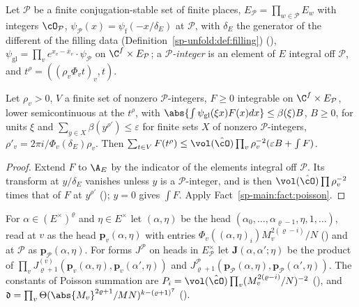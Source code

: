 Let $\mathcal P$ be a finite conjugation-stable set of finite places, $E_{\mathcal P}=\prod_{w\in\mathcal P}E_w$ with
integers $\cO_{\mathcal P}$, $\psi_{\mathcal P}(x)=\psi_{\mathrm f}(-x/\delta_E)$ at $\mathcal P$, with $\delta_E$ the generator of
the different of the filling data (Definition~\ref{sp-unfold:def:filling})
(), $\psi_{\mathrm{gl}}=\prod_ve^{x_v-\bar x_v}\cdot\psi_{\mathcal P}$ on
$\C^f\times E_{\mathcal P}$; a \emph{$\mathcal P$-integer} is an element of $E$ integral off $\mathcal P$, and
$t^\rho=((\rho_v\Phi_vt)_v,t)$.

\begin{proposition}
\label{sp-main:prop:poisson}
Let $\rho_v>0$, $V$ a finite set of nonzero $\mathcal P$-integers, $F\ge0$ integrable on $\C^f\times E_{\mathcal P}$,
lower semicontinuous at the $t^\rho$, with $\abs{\int\psi_{\mathrm{gl}}(\xi x)F(x)dx}\le\beta(\xi)B$, $B\ge0$, for
units $\xi$ and $\sum_{y\in X}\beta(y^{\rho'})\le\varepsilon$ for finite sets $X$ of nonzero $\mathcal P$-integers,
$\rho'_v=2\pi i/\Phi_v(\delta_E)\rho_v$. Then $\sum_{t\in V}F(t^\rho)\le\vol(\hat\cO)\prod_v\rho_v^{-2}
(\varepsilon B+\int F)$.
\end{proposition}

\begin{proof}
Extend $F$ to $\A_E$ by the indicator of the elements integral off $\mathcal P$. Its transform at
$y/\delta_E$ vanishes unless $y$ is a $\mathcal P$-integer, and is then $\vol(\hat\cO)\prod\rho_v^{-2}$ times
that of $F$ at $y^{\rho'}$ (); $y=0$ gives
$\int F$. Apply Fact~\ref{sp-main:fact:poisson}.
\end{proof}

For $\alpha\in(E^\times)^\varrho$ and $\eta\in E^\times$ let $(\alpha,\eta)$ be the head
$(\alpha_0,\dots,\alpha_{\varrho-1},\eta,1,\dots)$, read at $v$ as the head $\mathbf p_v(\alpha,\eta)$ with entries
$\Phi_v((\alpha,\eta)_i)M_v^{2(\varrho-i)}/N$ () and at $\mathcal P$ as
$\mathbf p_{\mathcal P}(\alpha,\eta)$. For forms $J^{\mathcal P}$ on heads in $E_{\mathcal P}^\times$ let $\mathbf J(\alpha,\alpha';\eta)$ be
the product of $\prod_vJ^{(v)}_{\varrho+1}(\mathbf p_v(\alpha,\eta),\mathbf p_v(\alpha',\eta))$ and
$J^{\mathcal P}_{\varrho+1}(\mathbf p_{\mathcal P}(\alpha,\eta),\mathbf p_{\mathcal P}(\alpha',\eta))$. The constants of Poisson summation are
$P_i=\vol(\hat\cO)\prod_v(M_v^{2(\varrho-i)}/N)^{-2}$ (), and
$\mathfrak d=\prod_v\Theta(\abs{M_v}^{2\varrho+1}/MN)^{k-(\varrho+1)^7}$
().

